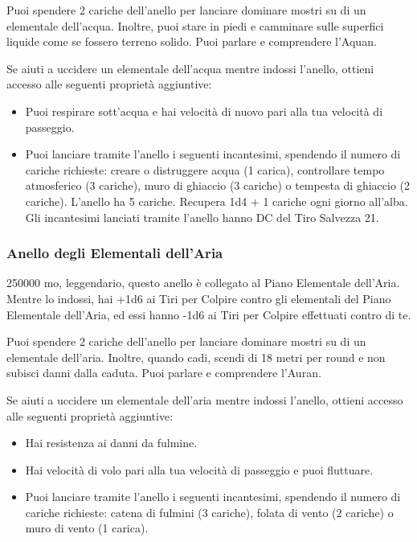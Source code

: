 \begin{multicols}{2}
	Puoi spendere 2 cariche dell'anello per lanciare dominare mostri su di un elementale dell'acqua. Inoltre, puoi stare in piedi e camminare sulle superfici liquide come se fossero terreno solido. Puoi parlare e comprendere l'Aquan.

	Se aiuti a uccidere un elementale dell'acqua mentre indossi l'anello, ottieni accesso alle seguenti proprietà aggiuntive:

	\medskip

	\begin{itemize}
		\item
		Puoi respirare sott'acqua e hai velocità di nuovo pari alla tua velocità di passeggio.
		\item
		Puoi lanciare tramite l'anello i seguenti incantesimi, spendendo il numero di cariche richieste: creare o distruggere acqua (1 carica), controllare tempo atmosferico (3 cariche), muro di ghiaccio (3 cariche) o tempesta di ghiaccio (2 cariche).
		L'anello ha 5 cariche. Recupera 1d4 + 1 cariche ogni giorno all'alba. Gli incantesimi lanciati tramite l'anello hanno DC del Tiro Salvezza 21.

	\end{itemize}

	\subsubsection*{Anello degli Elementali dell'Aria}
	250000 mo, leggendario, questo anello è collegato al Piano Elementale dell'Aria. Mentre lo indossi, hai +1d6 ai Tiri per Colpire contro gli elementali del Piano Elementale dell'Aria, ed essi hanno -1d6 ai Tiri per Colpire effettuati contro di te.

	Puoi spendere 2 cariche dell'anello per lanciare dominare mostri su di un elementale dell'aria. Inoltre, quando cadi, scendi di 18 metri per round e non subisci danni dalla caduta. Puoi parlare e comprendere l'Auran.

	Se aiuti a uccidere un elementale dell'aria mentre indossi l'anello, ottieni accesso alle seguenti proprietà aggiuntive:

	\medskip

	\begin{itemize}
		\item
		Hai resistenza ai danni da fulmine.
		\item
		Hai velocità di volo pari alla tua velocità di passeggio e puoi fluttuare.
		\item
		Puoi lanciare tramite l'anello i seguenti incantesimi, spendendo il numero di cariche richieste: catena di fulmini (3 cariche), folata di vento (2 cariche) o muro di vento (1 carica).
	\end{itemize}
	\medskip


\end{multicols}
